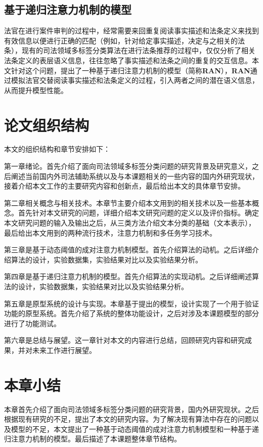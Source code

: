\subsection{基于递归注意力机制的模型}
法官在进行案件审判的过程中，经常需要来回重复阅读事实描述和法条定义来找到有效信息以便进行正确的匹配（例如，针对给定事实描述，决定与之相关的法条），现有的司法领域多标签分类算法在进行法条推荐的过程中，仅仅分析了相关法条定义的表层语义信息，往往忽略了事实描述和法条之间的重复的交互信息。本文针对这个问题，提出了一种基于递归注意力机制的模型（简称\textbf{RAN}），\textbf{RAN}通过模拟法官交替阅读事实描述和法条定义的过程，引入两者之间的潜在语义信息，从而提升模型性能。
\section{论文组织结构}
本文的组织结构和章节安排如下：

第一章绪论。首先介绍了面向司法领域多标签分类问题的研究背景及研究意义，之后阐述当前国内外司法辅助系统以及与本课题相关的一些内容的国内外研究现状，接着介绍本文工作的主要研究内容和创新点，最后给出本文的具体章节安排。

第二章相关概念与相关技术。本章节主要介绍本文用到的相关技术以及一些基本概念。首先针对本文研究的问题，详细介绍本文研究问题的定义以及评价指标。确定本文研究问题的输入及输出之后，从三类方法介绍文本分类的基础（文本表示），最后给出本文用到的两种流行技术，注意力机制和多任务学习技术。

第三章是基于动态阈值的成对注意力机制模型。首先介绍算法的动机。之后详细介绍算法的设计，实验数据集，实验结果对比以及实验结果分析。

第四章是基于递归注意力机制的模型。首先介绍算法的实现动机。之后详细阐述算法的设计，实验数据集，实验结果对比以及实验结果分析。

第五章是原型系统的设计与实现。本章基于提出的模型，设计实现了一个用于验证功能的原型系统。首先介绍了系统的整体功能设计，之后对涉及本课题模型的部分进行了功能测试。

第六章是总结与展望。这一章针对本文的内容进行总结，回顾研究内容和研究成果，并对未来工作进行展望。


\section{本章小结}
本章首先介绍了面向司法领域多标签分类问题的研究背景，国内外研究现状。之后根据现有研究的不足，提出了本文的研究内容。为了解决现有算法中存在的问题以及模型的不足，本文提出了一种基于动态阈值的成对注意力机制模型和一种基于递归注意力机制的模型。最后描述了本课题整体章节结构。



